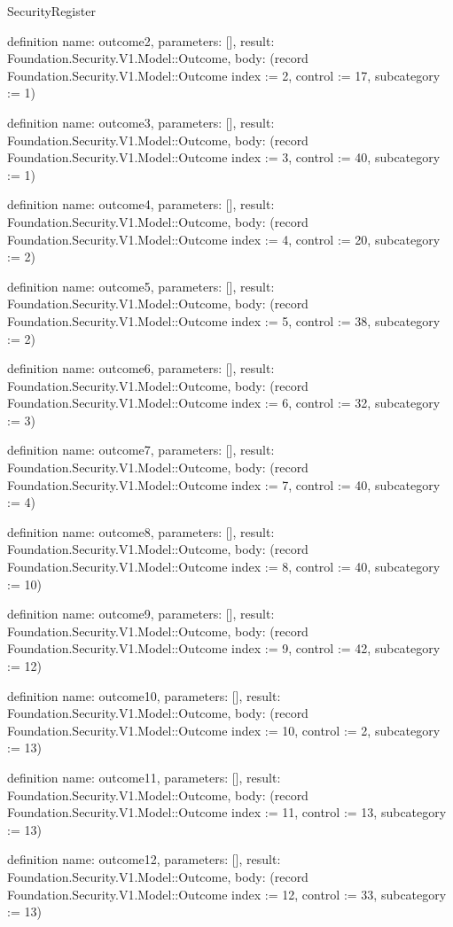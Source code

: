 \begin{lexlean}{SecurityRegister}
\begin{semanticmodule}
definition{
  name: outcome2,
  parameters: [],
  result: Foundation.Security.V1.Model::Outcome,
  body: (record Foundation.Security.V1.Model::Outcome {index := 2, control := 17, subcategory := 1})
}

definition{
  name: outcome3,
  parameters: [],
  result: Foundation.Security.V1.Model::Outcome,
  body: (record Foundation.Security.V1.Model::Outcome {index := 3, control := 40, subcategory := 1})
}

definition{
  name: outcome4,
  parameters: [],
  result: Foundation.Security.V1.Model::Outcome,
  body: (record Foundation.Security.V1.Model::Outcome {index := 4, control := 20, subcategory := 2})
}

definition{
  name: outcome5,
  parameters: [],
  result: Foundation.Security.V1.Model::Outcome,
  body: (record Foundation.Security.V1.Model::Outcome {index := 5, control := 38, subcategory := 2})
}

definition{
  name: outcome6,
  parameters: [],
  result: Foundation.Security.V1.Model::Outcome,
  body: (record Foundation.Security.V1.Model::Outcome {index := 6, control := 32, subcategory := 3})
}

definition{
  name: outcome7,
  parameters: [],
  result: Foundation.Security.V1.Model::Outcome,
  body: (record Foundation.Security.V1.Model::Outcome {index := 7, control := 40, subcategory := 4})
}

definition{
  name: outcome8,
  parameters: [],
  result: Foundation.Security.V1.Model::Outcome,
  body: (record Foundation.Security.V1.Model::Outcome {index := 8, control := 40, subcategory := 10})
}

definition{
  name: outcome9,
  parameters: [],
  result: Foundation.Security.V1.Model::Outcome,
  body: (record Foundation.Security.V1.Model::Outcome {index := 9, control := 42, subcategory := 12})
}

definition{
  name: outcome10,
  parameters: [],
  result: Foundation.Security.V1.Model::Outcome,
  body: (record Foundation.Security.V1.Model::Outcome {index := 10, control := 2, subcategory := 13})
}

definition{
  name: outcome11,
  parameters: [],
  result: Foundation.Security.V1.Model::Outcome,
  body: (record Foundation.Security.V1.Model::Outcome {index := 11, control := 13, subcategory := 13})
}

definition{
  name: outcome12,
  parameters: [],
  result: Foundation.Security.V1.Model::Outcome,
  body: (record Foundation.Security.V1.Model::Outcome {index := 12, control := 33, subcategory := 13})
}


\end{semanticmodule}
\end{lexlean}
